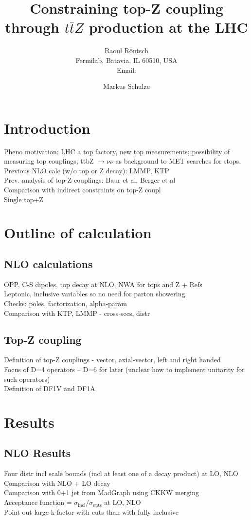 \documentclass[preprint]{JHEP3} %
\title{Constraining top-Z coupling through $t\bar{t}Z$ production at the LHC}
\author{Raoul R\"ontsch \\ Fermilab, Batavia, IL 60510, USA \\
  Email: \email{rontsch@fnal.gov} }
\author{Markus Schulze}
\begin{document}
\section{Introduction}
 Pheno motivation: LHC a top factory, new top measurements; possibility of measuring top couplings; ttbZ $\to \nu \nu$ as background to MET searches for stops. \\
 Previous NLO calc (w/o top or Z decay): LMMP, KTP \\
 Prev. analysis of top-Z couplings: Baur et al, Berger et al \\
 Comparison with indirect constraints on top-Z coupl \\
 Single top+Z \\

\section{Outline of calculation}
\subsection{NLO calculations}
OPP, C-S dipoles, top decay at NLO, NWA for tops and Z + Refs \\
Leptonic, inclusive variables so no need for parton showering \\
Checks: poles, factorization, alpha-param \\
Comparison with KTP, LMMP - cross-secs, distr \\

\subsection{Top-Z coupling}
Definition of top-Z couplings - vector, axial-vector, left and right handed \\
Focus of D=4 operators -- D=6 for later (unclear how to implement unitarity for such operators) \\
Definition of DF1V and DF1A

\section{Results}
\subsection{NLO Results}
Four distr incl scale bounds (incl at least one of a decay product) at LO, NLO\\
Comparison with NLO + LO decay \\
Comparison with 0+1 jet from MadGraph using CKKW merging \\
Acceptance function = $\sigma_{\mathrm{incl}} / \sigma_{\mathrm{cuts}}$ at LO, NLO\\
Point out large k-factor with cuts than with fully inclusive \\
\end{document}
